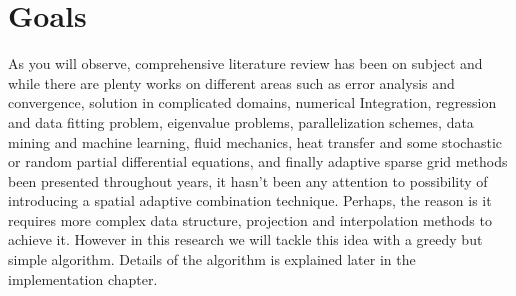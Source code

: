 \section{Goals}
As you will observe, comprehensive literature review has been on subject and while there are plenty works on different areas such as error analysis and convergence, solution in complicated domains, numerical Integration, regression and data fitting problem, eigenvalue problems, parallelization schemes, data mining and machine learning, fluid mechanics, heat transfer and some stochastic or random partial differential equations, and finally adaptive sparse grid methods been presented throughout years, it hasn't been any attention to possibility of introducing a spatial adaptive combination technique. Perhaps, the reason is it requires more complex data structure, projection and interpolation methods to achieve it. However in this research we will tackle this idea with a greedy but simple algorithm. Details of the algorithm is explained later in the implementation chapter.